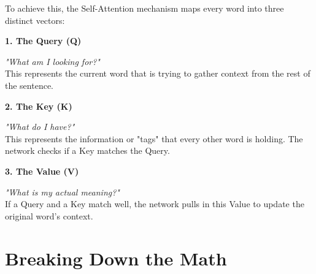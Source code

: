 \documentclass[11pt]{article}
\begin{document}
\vspace{0.15in}

To achieve this, the Self-Attention mechanism maps every word into three distinct vectors:

\vspace{0.15in}

\begin{darkbox}[top=8pt, bottom=8pt, left=12pt, right=12pt]
{\large\color{brandlight}\textbf{1. The Query (Q)}}

\vspace{0.05in}
{\fontsize{10}{12}\selectfont
\textit{"What am I looking for?"} \\
This represents the current word that is trying to gather context from the rest of the sentence.
}
\end{darkbox}

\vspace{0.1in}

\begin{darkbox}[top=8pt, bottom=8pt, left=12pt, right=12pt]
{\large\color{brandlight}\textbf{2. The Key (K)}}

\vspace{0.05in}
{\fontsize{10}{12}\selectfont
\textit{"What do I have?"} \\
This represents the information or "tags" that every other word is holding. The network checks if a Key matches the Query.
}
\end{darkbox}

\vspace{0.1in}

\begin{darkbox}[top=8pt, bottom=8pt, left=12pt, right=12pt]
{\large\color{brandlight}\textbf{3. The Value (V)}}

\vspace{0.05in}
{\fontsize{10}{12}\selectfont
\textit{"What is my actual meaning?"} \\
If a Query and a Key match well, the network pulls in this Value to update the original word's context.
}
\end{darkbox}

\vfill
\newpage

\section*{Breaking Down the Math}
\end{document}
